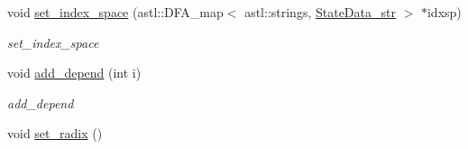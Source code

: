 \begin{DoxyCompactItemize}
void \hyperlink{class_problem_node_a620f579ddb1fc4fcb58b7d90cb729a0b}{set\+\_\+index\+\_\+space} (astl\+::\+D\+F\+A\+\_\+map$<$ astl\+::strings, \hyperlink{class_state_data__str}{State\+Data\+\_\+str} $>$ $\ast$idxsp)
\begin{DoxyCompactList}\small\item\em set\+\_\+index\+\_\+space \end{DoxyCompactList}\item 
void \hyperlink{class_problem_node_a09442a3f2d71c45db258f61e7bd47e7a}{add\+\_\+depend} (int i)
\begin{DoxyCompactList}\small\item\em add\+\_\+depend \end{DoxyCompactList}\item 
void \hyperlink{class_problem_node_a11506b767704fe9d6c4d7810e686bd9c}{set\+\_\+radix} ()\hypertarget{class_problem_node_a11506b767704fe9d6c4d7810e686bd9c}{}\label{class_problem_node_a11506b767704fe9d6c4d7810e686bd9c}


\end{DoxyCompactItemize}
